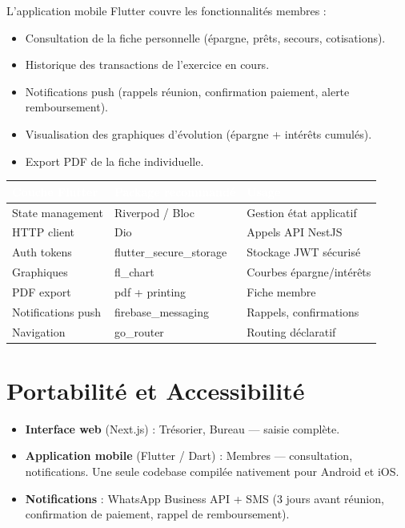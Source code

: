 \documentclass[12pt, a4paper]{report}
\begin{document}
L'application mobile Flutter couvre les fonctionnalités membres :

\begin{itemize}
  \item Consultation de la fiche personnelle (épargne, prêts, secours, cotisations).
  \item Historique des transactions de l'exercice en cours.
  \item Notifications push (rappels réunion, confirmation paiement, alerte remboursement).
  \item Visualisation des graphiques d'évolution (épargne + intérêts cumulés).
  \item Export PDF de la fiche individuelle.
\end{itemize}

\begin{center}
\small
{}
\begin{tabular}{L{3.5cm}L{4cm}L{5.5cm}}
  \toprule
  \textcolor{white}{\textbf{Couche Flutter}} &
  \textcolor{white}{\textbf{Package recommandé}} &
  \textcolor{white}{\textbf{Usage}} \\
  \midrule
  State management  & Riverpod / Bloc     & Gestion état applicatif \\
  HTTP client       & Dio                 & Appels API NestJS \\
  Auth tokens       & flutter\_secure\_storage & Stockage JWT sécurisé \\
  Graphiques        & fl\_chart           & Courbes épargne/intérêts \\
  PDF export        & pdf + printing      & Fiche membre \\
  Notifications push& firebase\_messaging & Rappels, confirmations \\
  Navigation        & go\_router          & Routing déclaratif \\
  \bottomrule
\end{tabular}
\end{center}

\section{Portabilité et Accessibilité}

\begin{itemize}
  \item \textbf{Interface web} (Next.js) : Trésorier, Bureau — saisie complète.
  \item \textbf{Application mobile} (Flutter / Dart) : Membres — consultation, notifications.
        Une seule codebase compilée nativement pour Android et iOS.
  \item \textbf{Notifications} : WhatsApp Business API + SMS (3 jours avant réunion,
        confirmation de paiement, rappel de remboursement).
\end{itemize}
\end{document}
